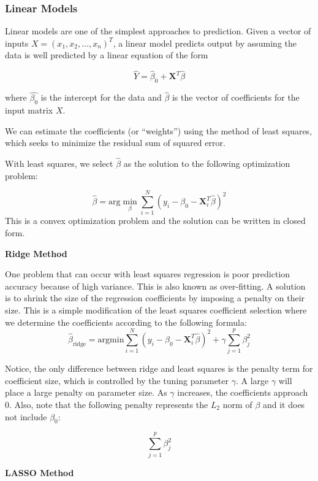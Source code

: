 \documentclass[12pt]{article}
\begin{document}
\subsubsection{Linear Models}
Linear models are one of the simplest approaches to prediction. Given a vector of inputs 
$X =  (x_1, x_2, \dots, x_n)^T$, a linear model predicts output by assuming the data is well predicted by a linear equation of the form 

$$\hat{Y} = \hat{\beta}_0 + \textbf{X}^T \hat{\beta}$$

where $\hat{\beta_0}$ is the intercept for the data and $\hat{\beta}$ is the vector of coefficients for the input matrix $X$. \cite[11]{springer} %

We can estimate the coefficients (or ``weights'') using the method of least squares, which seeks to minimize the residual sum of squared error. 

With least squares, we select $\hat{\beta}$ as the solution to the following optimization problem:

$$\hat{\beta} = \text{arg} \min_\beta \sum_{i=1}^{N} \left(y_i - \beta_0 - \textbf{X}_i^T \hat{\beta} \right)^2$$
\cite[42]{springer} This is a convex optimization problem and the solution can be written in closed form.


\textbf{Ridge Method}

One problem that can occur with least squares regression is poor prediction accuracy because of high variance. \cite[55]{springer} This is also known as over-fitting. A solution is to shrink the size of the regression coefficients by imposing a penalty on their size. This is a simple modification of the least squares coefficient selection where we determine the coefficients according to the following formula: 
$$\hat{\beta}_{\text{ridge}} = \text{argmin} \sum_{i=1}^{N} (y_i - \beta_0 -\textbf{X}_i^T \hat{\beta})^2 + \gamma \sum_{j=1}^{p}\beta_j^2$$
\cite[59]{springer}

Notice, the only difference between ridge and least squares is the penalty term for coefficient size, which is controlled by the tuning parameter $\gamma$. A large $\gamma$ will place a large penalty on parameter size. As $\gamma$ increases, the coefficients approach 0. Also, note that the following penalty represents the $L_2$ norm of $\beta$ and it does not include $\beta_0$:

$$ \sum_{j=1}^{p}\beta_j^2$$

\textbf{LASSO Method}
\end{document}
